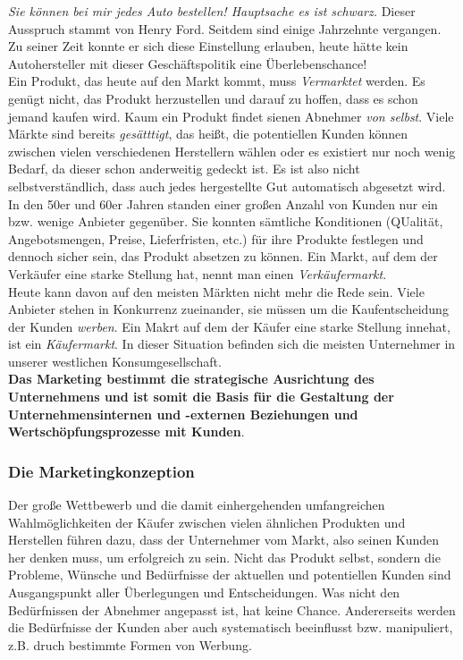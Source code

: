\documentclass[a4paper, 12pt]{report}
\begin{document}
\emph{Sie können bei mir jedes Auto bestellen! Hauptsache es ist schwarz.}
Dieser Ausspruch stammt von Henry Ford. Seitdem sind einige Jahrzehnte
vergangen. Zu seiner Zeit konnte er sich diese Einstellung erlauben, heute
hätte kein Autohersteller mit dieser Geschäftspolitik eine Überlebenschance! \\

Ein Produkt, das heute auf den Markt kommt, muss \emph{Vermarktet} werden. Es
genügt nicht, das Produkt herzustellen und darauf zu hoffen, dass es schon
jemand kaufen wird. Kaum ein Produkt findet sienen Abnehmer \emph{von selbst}.
Viele Märkte sind bereits \emph{gesätttigt}, das heißt, die potentiellen Kunden
können zwischen vielen verschiedenen Herstellern wählen oder es existiert nur
noch wenig Bedarf, da dieser schon anderweitig gedeckt ist. Es ist also nicht
selbstverständlich, dass auch jedes hergestellte Gut automatisch abgesetzt
wird. \\

In den 50er und 60er Jahren standen einer großen Anzahl von Kunden nur ein bzw.
wenige Anbieter gegenüber. Sie konnten sämtliche Konditionen (QUalität,
Angebotsmengen, Preise, Lieferfristen, etc.) für ihre Produkte festlegen und
dennoch sicher sein, das Produkt absetzen zu können. Ein Markt, auf dem der
Verkäufer eine starke Stellung hat, nennt man einen \emph{Verkäufermarkt}. \\

Heute kann davon auf den meisten Märkten nicht mehr die Rede sein. Viele
Anbieter stehen in Konkurrenz zueinander, sie müssen um die Kaufentscheidung der
Kunden \emph{werben}. Ein Makrt auf dem der Käufer eine starke Stellung innehat,
ist ein \emph{Käufermarkt}. In dieser Situation befinden sich die meisten
Unternehmer in unserer westlichen Konsumgesellschaft. \\

\textbf{Das Marketing bestimmt die strategische Ausrichtung des Unternehmens und
ist somit die Basis für die Gestaltung der Unternehmensinternen und -externen
Beziehungen und Wertschöpfungsprozesse mit Kunden}. \\

\subsubsection{Die Marketingkonzeption}

Der große Wettbewerb und die damit einhergehenden umfangreichen
Wahlmöglichkeiten der Käufer zwischen vielen ähnlichen Produkten und Herstellen
führen dazu, dass der Unternehmer vom Markt, also seinen Kunden her denken muss,
um erfolgreich zu sein. Nicht das Produkt selbst, sondern die Probleme, Wünsche
und Bedürfnisse der aktuellen und potentiellen Kunden sind Ausgangspunkt aller
Überlegungen und Entscheidungen. Was nicht den Bedürfnissen der Abnehmer
angepasst ist, hat keine Chance. Andererseits werden die Bedürfnisse der Kunden
aber auch systematisch beeinflusst bzw. manipuliert, z.B. druch bestimmte Formen
von Werbung. \\
\end{document}

